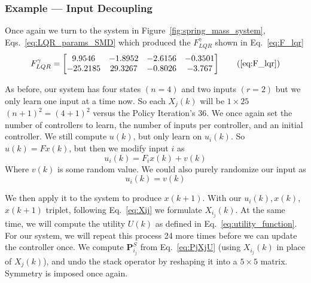 \FloatBarrier\subsubsection{Example --- Input Decoupling}%
\label{sub:example_input_decoupling}
Once again we turn to the system in Figure~\ref{fig:spring_mass_system}, Eqs.~\ref{eq:LQR_params_SMD} which produced the $F_{LQR}^\gamma$ shown in Eq.~\ref{eq:F_lqr}
\begin{equation}
    F_{LQR}^\gamma=\left[\begin{matrix}9.9546&-1.8952&-2.6156&-0.3501\\-25.2185&29.3267&-0.8026&-3.767\\\end{matrix}\right]
    \tag{\ref{eq:F_lqr}}
\end{equation}

As before, our system has four states $(n=4)$ and two inputs $(r=2)$ but we only learn one input at a time now. So each $X_j\left(k\right)$ will be $1\times25$ ${\left(n+1\right)}^2={\left(4+1\right)}^2$ versus the Policy Iteration's 36. 
We once again set the number of controllers to learn, the number of inputs per controller, and an initial controller.
We still compute $u\left(k\right)$, but only learn on $u_i\left(k\right)$. So $u(k) = Fx(k)$, but then we modify input $i$ as
\begin{equation}
    u_i(k)=F_i x\left(k\right)+v\left(k\right)
\end{equation}
Where $v\left(k\right)$ is some random value. We could also purely randomize our input as
\begin{equation}
    u_i\left(k\right)=v\left(k\right)
\end{equation}

We then apply it to the system to produce $x\left(k+1\right)$. With our $u_i\left(k\right),x\left(k\right)$, $x\left(k+1\right)$ triplet, following Eq.~\ref{eq:Xij} we formulate $X_{i_j}(k)$. At the same time, we will compute the utility $U\left(k\right)$ as defined in Eq.~\ref{eq:utility_function}.
For our system, we will repeat this process 24 more times before we can update the controller once. We compute $\textbf{P}_{i_j}^S$ from Eq.~\ref{eq:PjXjU} (using $X_{i_j}(k)$ in place of $X_{j}(k)$), and undo the stack operator by reshaping it into a $5 \times5$ matrix. Symmetry is imposed once again.

